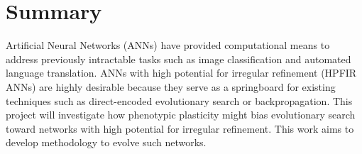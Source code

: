 \section{Summary}
Artificial Neural Networks (ANNs) have provided computational means to address previously intractable tasks such as image classification and automated language translation.
ANNs with high potential for irregular refinement (HPFIR ANNs) are highly desirable because they serve as a springboard for existing techniques such as direct-encoded evolutionary search or backpropagation.
This project will investigate how phenotypic plasticity might bias evolutionary search toward networks with high potential for irregular refinement.
This work aims to develop methodology to evolve such networks.
